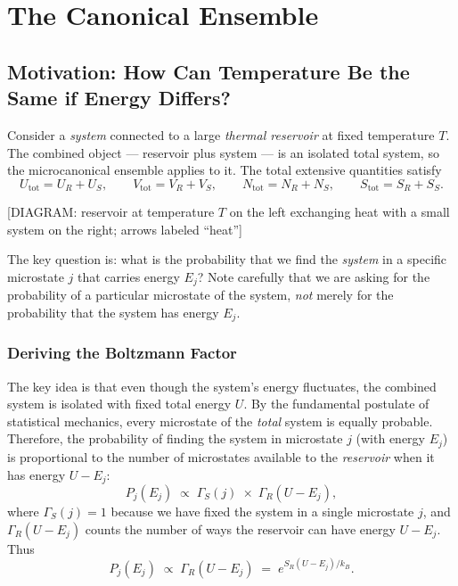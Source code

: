 \chapter{The Canonical Ensemble}

\section{Motivation: How Can Temperature Be the Same if Energy Differs?}

Consider a \emph{system} connected to a large \emph{thermal reservoir} at fixed temperature $T$.
The combined object — reservoir plus system — is an isolated total system, so the
microcanonical ensemble applies to it.  The total extensive quantities satisfy
\begin{equation}
    U_{\text{tot}} = U_R + U_S, \qquad
    V_{\text{tot}} = V_R + V_S, \qquad
    N_{\text{tot}} = N_R + N_S, \qquad
    S_{\text{tot}} = S_R + S_S.
\end{equation}

\begin{center}[DIAGRAM: reservoir at temperature $T$ on the left exchanging heat with a small system on the right; arrows labeled ``heat'']\end{center}

The key question is: what is the probability that we find the \emph{system} in a specific
microstate $j$ that carries energy $E_j$?  Note carefully that we are asking for the probability of
a particular microstate of the system, \emph{not} merely for the probability that the system has
energy $E_j$.

\subsection{Deriving the Boltzmann Factor}

The key idea is that even though the system's energy fluctuates, the combined system is
isolated with fixed total energy $U$.  By the fundamental postulate of statistical mechanics,
every microstate of the \emph{total} system is equally probable.  Therefore, the probability
of finding the system in microstate $j$ (with energy $E_j$) is proportional to the number of
microstates available to the \emph{reservoir} when it has energy $U - E_j$:
\begin{equation}
    P_j(E_j) \;\propto\; \Gamma_S(j)\;\times\;\Gamma_R(U - E_j),
\end{equation}
where $\Gamma_S(j) = 1$ because we have fixed the system in a single microstate $j$, and
$\Gamma_R(U-E_j)$ counts the number of ways the reservoir can have energy $U - E_j$.  Thus
\begin{equation}
    P_j(E_j) \;\propto\; \Gamma_R(U - E_j) \;=\; e^{S_R(U - E_j)/k_B}.
\end{equation}

